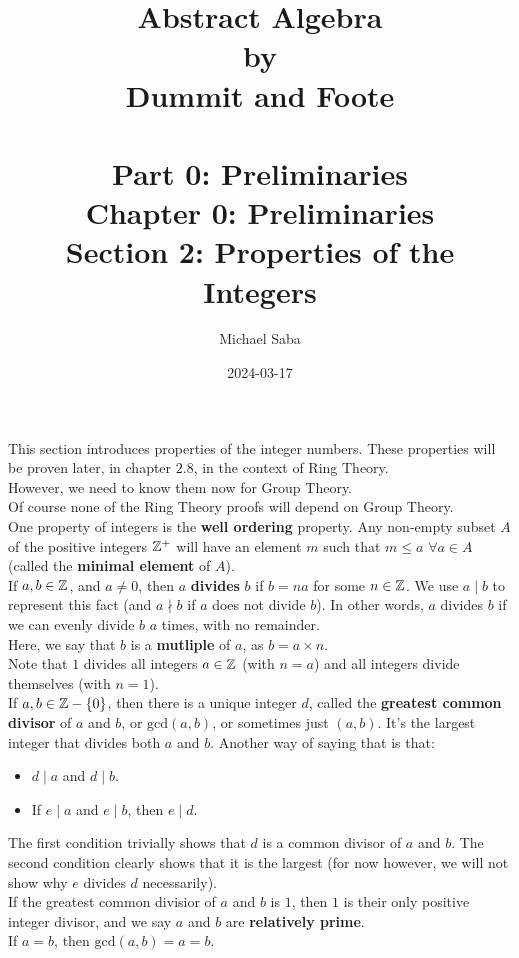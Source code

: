 \documentclass[12pt]{article}
\title{%
    \Huge Abstract Algebra \\
    \large by \\
    \Large Dummit and Foote \\~\\
    \huge Part 0: Preliminaries \\
    \LARGE Chapter 0: Preliminaries \\
    \Large Section 2: Properties of the Integers
}
\date{2024-03-17}
\author{Michael Saba}
\begin{document}
    \maketitle
    \newpage    
    \setlength{\parindent}{0pt}

    This section introduces properties of the integer numbers.
    These properties will be proven later, in chapter $2.8$,
    in the context of Ring Theory. \\
    However, we need to know them now for Group Theory. \\
    Of course none of the Ring Theory proofs will depend
    on Group Theory. \\

    One property of integers is the \textbf{well ordering} property.
    Any non-empty subset $A$ of the positive integers $\mathbb{Z}^+$
    will have an element $m$
    such that $m \leqslant a$ $\forall a \in A$
    (called the \textbf{minimal element} of $A$). \\

    If $a, b \in \mathbb{Z}$, and $a \neq 0$,
    then $a$ \textbf{divides} $b$ if $b = na$ for some $n \in \mathbb{Z}$.
    We use $a \mid b$ to represent this fact
    (and $a \nmid b$ if $a$ does not divide $b$).
    In other words, $a$ divides $b$ if we can evenly divide
    $b$ $a$ times, with no remainder. \\
    Here, we say that $b$ is a \textbf{mutliple} of $a$,
    as $b = a \times n$. \\
    Note that $1$ divides all integers $a \in \mathbb{Z}$ (with $n = a$)
    and all integers divide themselves (with $n = 1$). \\
    

    If $a, b \in \mathbb{Z} - \{0\}$,
    then there is a unique integer $d$,
    called the \textbf{greatest common divisor} of $a$ and $b$,
    or $\text{gcd}(a, b)$, or sometimes just $(a, b)$.
    It's the largest integer that divides both $a$ and $b$.
    Another way of saying that is that:
    \begin{itemize}[label=$\diamond$]
        \item 
            $d \mid a$ and $d \mid b$.
        \item
            If $e \mid a$ and $e \mid b$, then $e \mid d$.
    \end{itemize}
    The first condition trivially shows that $d$ is a common divisor
    of $a$ and $b$.
    The second condition clearly shows that it is the largest
    (for now however, we will not show why $e$ divides $d$
    necessarily). \\
    If the greatest common divisior of $a$ and $b$ is $1$,
    then $1$ is their only positive integer divisor, 
    and we say $a$ and $b$ are \textbf{relatively prime}. \\
    If $a = b$, then $\text{gcd}(a, b) = a = b$. \\
 
\end{document}
